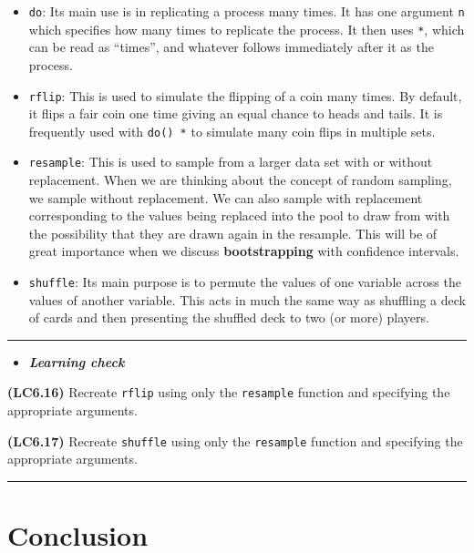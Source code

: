 \documentclass[]{tufte-book}
\let\oldrule=\rule
\renewcommand{\rule}[1]{\oldrule{\linewidth}}
\newenvironment{rmdblock}[1]
  {\begin{shaded*}
  \begin{itemize}
  \renewcommand{\labelitemi}{
    \raisebox{-.7\height}[0pt][0pt]{
    }
  }
  \item
  }
  {
  \end{itemize}
  \end{shaded*}
  }
\newenvironment{learncheck}
  {\begin{rmdblock}{warning}}
  {\end{rmdblock}}
\begin{document}
\begin{itemize}
\item
  \texttt{do}: Its main use is in replicating a process many times. It
  has one argument \texttt{n} which specifies how many times to
  replicate the process. It then uses \texttt{*}, which can be read as
  ``times'', and whatever follows immediately after it as the process.
\item
  \texttt{rflip}: This is used to simulate the flipping of a coin many
  times. By default, it flips a fair coin one time giving an equal
  chance to heads and tails. It is frequently used with \texttt{do()\ *}
  to simulate many coin flips in multiple sets.
\item
  \texttt{resample}: This is used to sample from a larger data set with
  or without replacement. When we are thinking about the concept of
  random sampling, we sample without replacement. We can also sample
  with replacement corresponding to the values being replaced into the
  pool to draw from with the possibility that they are drawn again in
  the resample. This will be of great importance when we discuss
  \textbf{bootstrapping} with confidence intervals.
\item
  \texttt{shuffle}: Its main purpose is to permute the values of one
  variable across the values of another variable. This acts in much the
  same way as shuffling a deck of cards and then presenting the shuffled
  deck to two (or more) players.
\end{itemize}

\begin{center}\rule{0.5\linewidth}{\linethickness}\end{center}

\begin{learncheck}
\textbf{\emph{Learning check}}
\end{learncheck}

\textbf{(LC6.16)} Recreate \texttt{rflip} using only the
\texttt{resample} function and specifying the appropriate arguments.

\textbf{(LC6.17)} Recreate \texttt{shuffle} using only the
\texttt{resample} function and specifying the appropriate arguments.

\begin{center}\rule{0.5\linewidth}{\linethickness}\end{center}

\section{Conclusion}\label{conclusion-2}
\end{document}
